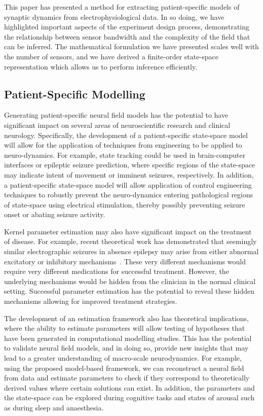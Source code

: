 \documentclass[10pt]{article}
\begin{document}
This paper has presented a method for extracting patient-specific models of synaptic dynamics from electrophysiological data. In so doing, we have highlighted important aspects of the experiment design process, demonstrating the relationship between sensor bandwidth and the complexity of the field that can be inferred. The mathematical formulation we have presented scales well with the number of sensors, and we have derived a finite-order state-space representation which allows us to perform inference efficiently. 

\subsection*{Patient-Specific Modelling}

Generating patient-specific neural field models has the potential to have significant impact on several areas of neuroscientific research and clinical neurology. Specifically, the development of a patient-specific state-space model will allow for the application of techniques from engineering to be applied to neuro-dynamics. For example, state tracking could be used in brain-computer interfaces or epileptic seizure prediction, where specific regions of the state-space may indicate intent of movement or imminent seizures, respectively. In addition, a patient-specific state-space model will allow application of control engineering techniques to robustly prevent the neuro-dynamics entering pathological regions of state-space using electrical stimulation, thereby possibly preventing seizure onset or abating seizure activity.

Kernel parameter estimation may also have significant impact on the treatment of disease. For example, recent theoretical work has demonstrated that seemingly similar electrographic seizures in absence epilepsy may arise from either abnormal excitatory or inhibitory mechanisms~\cite{Marten2009}. These very different mechanisms would require very different medications for successful treatment. However, the underlying mechanisms would be hidden from the clinician in the normal clinical setting. Successful parameter estimation has the potential to reveal these hidden mechanisms allowing for improved treatment strategies. 

The development of an estimation framework also has theoretical implications, where the ability to estimate parameters will allow testing of hypotheses that have been generated in computational modelling studies. This has the potential to validate neural field models, and in doing so, provide new insights that may lead to a greater understanding of macro-scale neurodynamics. For example, using the proposed model-based framework, we can reconstruct a neural field from data and estimate parameters to check if they correspond to theoretically derived values where certain solutions can exist. In addition, the parameters and the state-space can be explored during cognitive tasks and states of arousal such as during sleep and anaesthesia. 
\end{document}
